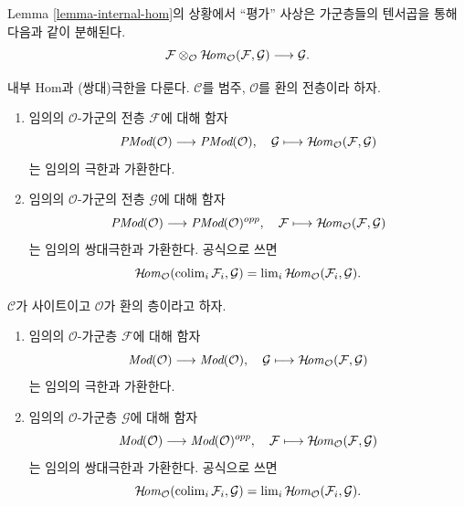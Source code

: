 \noindent
Lemma \ref{lemma-internal-hom}의 상황에서 ``평가'' 사상은 가군층들의
텐서곱을 통해 다음과 같이 분해된다.
$$
\mathcal{F}
\otimes_\mathcal{O}
\mathop{\mathcal{H}\!\mathit{om}}\nolimits_\mathcal{O}(\mathcal{F}, \mathcal{G})
\longrightarrow
\mathcal{G}.
$$

\begin{lemma}
\label{lemma-internal-hom-commute-limits}
내부 Hom과 (쌍대)극한을 다룬다. $\mathcal{C}$를 범주,
$\mathcal{O}$를 환의 전층이라 하자.
\begin{enumerate}
\item 임의의 $\mathcal{O}$-가군의 전층 $\mathcal{F}$에 대해 함자
$$
\textit{PMod}(\mathcal{O}) \longrightarrow \textit{PMod}(\mathcal{O})
, \quad
\mathcal{G} \longmapsto \mathop{\mathcal{H}\!\mathit{om}}\nolimits_\mathcal{O}(\mathcal{F}, \mathcal{G})
$$
는 임의의 극한과 가환한다.
\item 임의의 $\mathcal{O}$-가군의 전층 $\mathcal{G}$에 대해 함자
$$
\textit{PMod}(\mathcal{O}) \longrightarrow \textit{PMod}(\mathcal{O})^{opp}
, \quad
\mathcal{F} \longmapsto \mathop{\mathcal{H}\!\mathit{om}}\nolimits_\mathcal{O}(\mathcal{F}, \mathcal{G})
$$
는 임의의 쌍대극한과 가환한다. 공식으로 쓰면
$$
\mathop{\mathcal{H}\!\mathit{om}}\nolimits_\mathcal{O}(\mathop{\mathrm{colim}}\nolimits_i \mathcal{F}_i, \mathcal{G})
=
\mathop{\mathrm{lim}}\nolimits_i \mathop{\mathcal{H}\!\mathit{om}}\nolimits_\mathcal{O}(\mathcal{F}_i, \mathcal{G}).
$$
\end{enumerate}
$\mathcal{C}$가 사이트이고 $\mathcal{O}$가 환의 층이라고 하자.
\begin{enumerate}
\item[(3)] 임의의 $\mathcal{O}$-가군층 $\mathcal{F}$에 대해 함자
$$
\textit{Mod}(\mathcal{O}) \longrightarrow \textit{Mod}(\mathcal{O})
, \quad
\mathcal{G} \longmapsto \mathop{\mathcal{H}\!\mathit{om}}\nolimits_\mathcal{O}(\mathcal{F}, \mathcal{G})
$$
는 임의의 극한과 가환한다.
\item[(4)] 임의의 $\mathcal{O}$-가군층 $\mathcal{G}$에 대해 함자
$$
\textit{Mod}(\mathcal{O}) \longrightarrow \textit{Mod}(\mathcal{O})^{opp}
, \quad
\mathcal{F} \longmapsto \mathop{\mathcal{H}\!\mathit{om}}\nolimits_\mathcal{O}(\mathcal{F}, \mathcal{G})
$$
는 임의의 쌍대극한과 가환한다. 공식으로 쓰면
$$
\mathop{\mathcal{H}\!\mathit{om}}\nolimits_\mathcal{O}(\mathop{\mathrm{colim}}\nolimits_i \mathcal{F}_i, \mathcal{G})
=
\mathop{\mathrm{lim}}\nolimits_i \mathop{\mathcal{H}\!\mathit{om}}\nolimits_\mathcal{O}(\mathcal{F}_i, \mathcal{G}).
$$
\end{enumerate}
\end{lemma}

